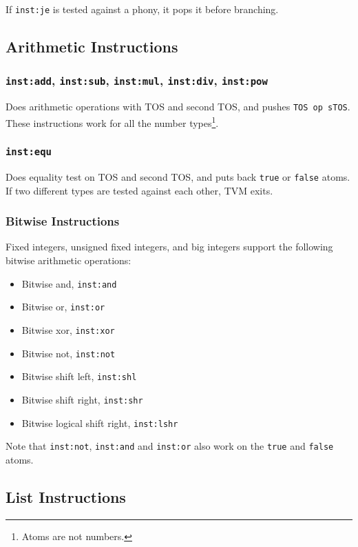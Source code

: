 \documentclass{article}
\newcommand{\inst}[1] {\texttt{inst:#1}}
\begin{document}
If \inst{je} is tested against a phony, it pops it before branching.

\subsection{Arithmetic Instructions}

\subsubsection{\inst{add}, \inst{sub}, \inst{mul}, \inst{div}, \inst{pow}}

Does arithmetic operations with TOS and second TOS, and pushes \texttt{TOS op sTOS}. These instructions work for all the number types\footnote{Atoms are not numbers.}.

\subsubsection{\inst{equ}}

Does equality test on TOS and second TOS, and puts back \texttt{true} or \texttt{false} atoms. If two different types are tested against each other, TVM exits.

\subsubsection{Bitwise Instructions}

Fixed integers, unsigned fixed integers, and big integers support the following bitwise arithmetic operations:
\begin{itemize}
\item Bitwise and, \inst{and}
\item Bitwise or, \inst{or}
\item Bitwise xor, \inst{xor}
\item Bitwise not, \inst{not}
\item Bitwise shift left, \inst{shl}
\item Bitwise shift right, \inst{shr}
\item Bitwise logical shift right, \inst{lshr}
\end{itemize}

Note that \inst{not}, \inst{and} and \inst{or} also work on the \texttt{true} and \texttt{false} atoms.

\subsection{List Instructions}
\end{document}
